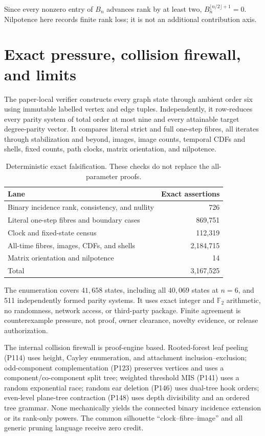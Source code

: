 \documentclass[a4paper,10pt]{amsart}
\theoremstyle{remark}
\newcommand{\Ftwo}{\mathbb F_2}
\begin{document}
Since every nonzero entry of $B_n$ advances rank by at least two,
$B_n^{\lfloor n/2\rfloor+1}=0$.  Nilpotence here records finite rank loss; it
is not an additional contribution axis.

\section{Exact pressure, collision firewall, and limits}\label{sec:audit}

The paper-local verifier constructs every graph state through ambient order
six using immutable labelled vertex and edge tuples.  Independently, it
row-reduces every parity system of total order at most nine and every
attainable target degree-parity vector.  It compares literal strict and full
one-step fibres, all iterates through stabilization and beyond, images,
image counts, temporal CDFs and shells, fixed counts, path clocks, matrix
orientation, and nilpotence.

\begin{table}[ht]
\centering
\small
\caption{Deterministic exact falsification.  These checks do not replace the
all-parameter proofs.}
\label{tab:audit}
\begin{tabular}{@{}lr@{}}
\toprule
Lane & Exact assertions \\
\midrule
Binary incidence rank, consistency, and nullity & 726 \\
Literal one-step fibres and boundary cases & 869,751 \\
Clock and fixed-state census & 112,319 \\
All-time fibres, images, CDFs, and shells & 2,184,715 \\
Matrix orientation and nilpotence & 14 \\
\midrule
Total & 3,167,525 \\
\bottomrule
\end{tabular}
\end{table}

The enumeration covers $41{,}658$ states, including all $40{,}069$ states at
$n=6$, and 511 independently formed parity systems.  It uses exact integer
and $\Ftwo$ arithmetic, no randomness, network access, or third-party package.
Finite agreement is counterexample pressure, not proof, owner clearance,
novelty evidence, or release authorization.

The internal collision firewall is proof-engine based.  Rooted-forest leaf
peeling (P114) uses height, Cayley enumeration, and attachment
inclusion--exclusion; odd-component complementation (P123) preserves vertices
and uses a component/co-component split tree; weighted threshold MIS (P141)
uses a random exponential race; random ear deletion (P146) uses dual-tree
hook orders; even-level plane-tree contraction (P148) uses depth divisibility
and an ordered tree grammar.  None mechanically yields the connected binary
incidence extension or its rank-only powers.  The common silhouette
``clock--fibre--image'' and all generic pruning language receive zero credit.
\end{document}

